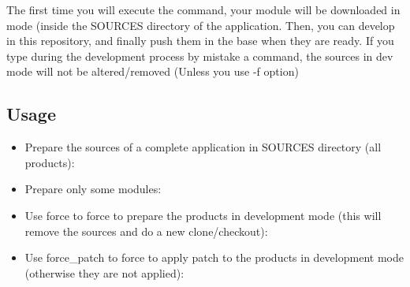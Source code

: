 \documentclass[a4paper,10pt,english]{sphinxmanual}
\begin{document}
The first time you will execute the  command,
your module will be downloaded in  mode
(inside the SOURCES directory of the application.
Then, you can develop in this repository, and finally push
them in the base when they are ready.
If you type during the development process by mistake
a  command, the sources in dev mode will
not be altered/removed (Unless you use -f option)


\subsection{Usage}
\label{\detokenize{commands/prepare:usage}}\begin{itemize}
\item {} 
Prepare the sources of a complete application in SOURCES directory (all products):

%
\begin{sphinxVerbatim}[commandchars=\\\{\}]
  
\end{sphinxVerbatim}

\item {} 
Prepare only some modules:

%
\begin{sphinxVerbatim}[commandchars=\\\{\}]
      
\end{sphinxVerbatim}

\item {} 
Use \textendash{}force to force to prepare the products in development mode
(this will remove the sources and do a new clone/checkout):

%
\begin{sphinxVerbatim}[commandchars=\\\{\}]
   
\end{sphinxVerbatim}

\item {} 
Use \textendash{}force\_patch to force to apply patch to the products
in development mode (otherwise they are not applied):

%
\begin{sphinxVerbatim}[commandchars=\\\{\}]
   
\end{sphinxVerbatim}

\end{itemize}
\end{document}
